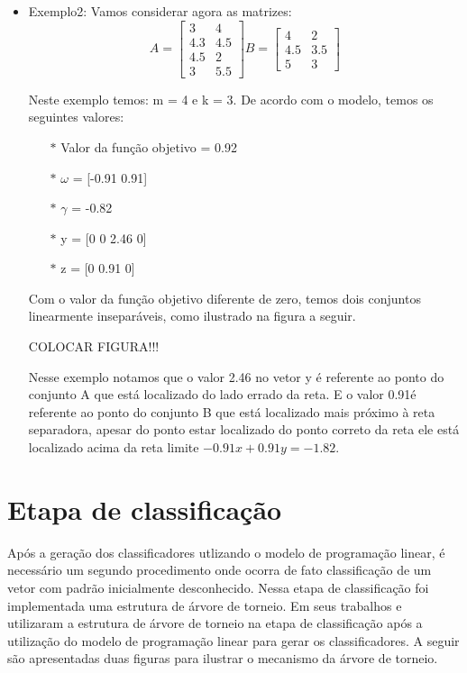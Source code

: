 \begin{itemize}
\item Exemplo2:
Vamos  considerar agora as matrizes:
$$A=\begin{bmatrix}3 & 4\\ 4.3 & 4.5\\ 4.5 & 2\\ 3 & 5.5\end{bmatrix}
B=\begin{bmatrix}4 & 2\\ 4.5 & 3.5\\ 5 & 3\end{bmatrix}$$

Neste exemplo temos: m = 4 e k = 3. De acordo com o modelo, temos os seguintes valores:
\begin{itemize}
\item[$\ast$] Valor da função objetivo = 0.92
\item[$\ast$] $\omega$ = [-0.91  0.91]
\item[$\ast$] $\gamma$ = -0.82
\item[$\ast$] y = [0 0 2.46 0]
\item[$\ast$] z = [0 0.91 0]
\end{itemize}

Com o valor da função objetivo diferente de zero, temos dois conjuntos linearmente inseparáveis, como ilustrado na figura a seguir.

COLOCAR FIGURA!!!

Nesse exemplo notamos que o valor 2.46 no vetor y é referente ao ponto do conjunto A que está localizado do lado errado da reta. E o valor 0.91é referente ao ponto do conjunto B que está localizado mais próximo à reta separadora, apesar do ponto estar localizado do ponto correto da reta ele está localizado acima da reta limite $-0.91x + 0.91y = -1.82$.
\end{itemize}

\section{Etapa de classificação}
Após a geração dos classificadores utlizando o modelo de programação linear, é necessário um segundo procedimento onde ocorra de fato classificação de um vetor com padrão inicialmente desconhecido. Nessa etapa de classificação foi implementada uma estrutura de árvore de torneio.
Em seus trabalhos  e  utilizaram a estrutura de árvore de torneio na etapa de classificação após a utilização do modelo de programação linear para gerar os classificadores.
A seguir são apresentadas duas figuras para ilustrar o mecanismo da árvore de torneio.

